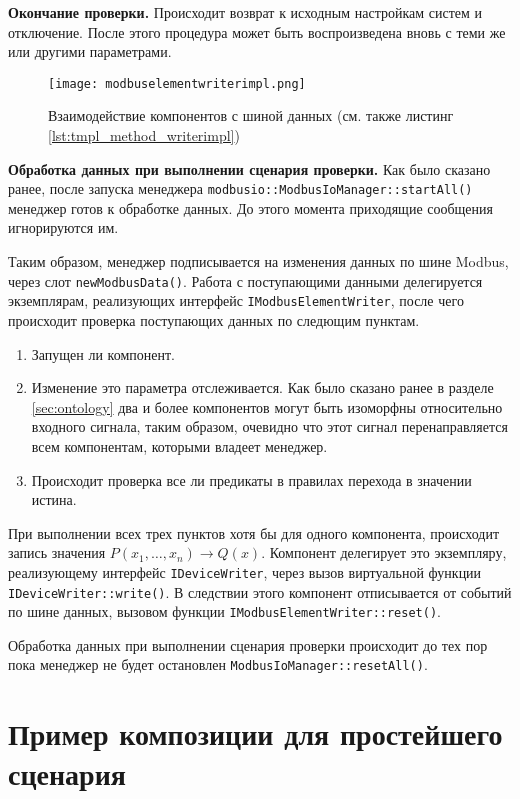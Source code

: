 \textbf{Окончание проверки.}
Происходит возврат к исходным настройкам систем и отключение.
После этого процедура может быть воспроизведена вновь с теми же
или другими параметрами. 

\begin{center}
    \begin{figure}
        \texttt{[image: modbuselementwriterimpl.png]}
        \caption{Взаимодействие компонентов с шиной данных (см. также листинг \ref{lst:tmpl_method_writerimpl})}
        \label{fig:modbuselementwriterimpl}
    \end{figure}
\end{center}


\textbf{Обработка данных при выполнении сценария проверки.}
Как было сказано ранее, после запуска менеджера \texttt{modbusio::ModbusIoManager::startAll()}
менеджер готов к обработке данных.
До этого момента приходящие сообщения игнорируются им.

Таким образом, менеджер подписывается на изменения данных по шине Modbus,
через слот \texttt{newModbusData()}.
Работа с поступающими данными делегируется экземплярам, реализующих интерфейс
\texttt{IModbusElementWriter}, после чего происходит проверка поступающих данных
по следющим пунктам.
\begin{enumerate}
    \item Запущен ли компонент.
    \item Изменение это параметра отслеживается. Как было сказано ранее в разделе \ref{sec:ontology}
        два и более компонентов могут быть изоморфны относительно входного сигнала,
        таким образом, очевидно что этот сигнал перенаправляется всем компонентам,
        которыми владеет менеджер.
    \item Происходит проверка все ли предикаты в правилах перехода в значении истина. 
\end{enumerate}
При выполнении всех трех пунктов хотя бы для одного компонента,
происходит запись значения $P(x_1, \ldots, x_n) \to Q(x)$.
Компонент делегирует это экземпляру, реализующему интерфейс \texttt{IDeviceWriter},
через вызов виртуальной функции \texttt{IDeviceWriter::write()}.
В следствии этого компонент отписывается от событий по шине данных,
вызовом функции \texttt{IModbusElementWriter::reset()}.

Обработка данных при выполнении сценария проверки происходит до тех пор
пока менеджер не будет остановлен \texttt{ModbusIoManager::resetAll()}.


\section{Пример композиции для простейшего сценария}

